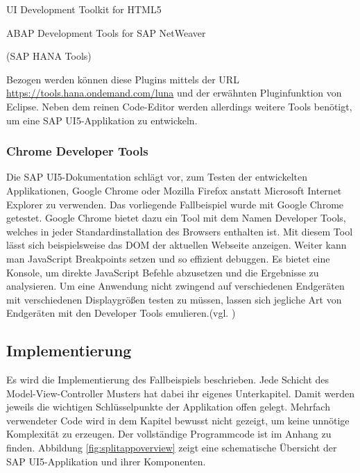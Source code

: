 \vspace{1em}
\begin{compactitem}
  \item UI Development Toolkit for HTML5
  \item ABAP Development Tools for SAP NetWeaver
  \item (SAP HANA Tools)
\end{compactitem}
\vspace{1em}

Bezogen werden können diese Plugins mittels der URL \url{https://tools.hana.ondemand.com/luna} und der erwähnten Pluginfunktion von Eclipse. Neben dem reinen Code-Editor werden allerdings weitere Tools benötigt, um eine SAP UI5-Applikation zu entwickeln.

\subsubsection{Chrome Developer Tools}
Die SAP UI5-Dokumentation schlägt vor, zum Testen der entwickelten Applikationen, Google Chrome oder Mozilla Firefox anstatt Microsoft Internet Explorer zu verwenden. Das vorliegende Fallbeispiel wurde mit Google Chrome getestet. Google Chrome bietet dazu ein Tool mit dem Namen Developer Tools, welches in jeder Standardinstallation des Browsers enthalten ist. Mit diesem Tool lässt sich beispielsweise das DOM der aktuellen Webseite anzeigen. Weiter kann man JavaScript Breakpoints setzen und so effizient debuggen. Es bietet eine Konsole, um direkte JavaScript Befehle abzusetzen und die Ergebnisse zu analysieren. Um eine Anwendung nicht zwingend auf verschiedenen Endgeräten mit verschiedenen Displaygrößen testen zu müssen, lassen sich jegliche Art von Endgeräten mit den Developer Tools emulieren.(vgl. \cite{DevTools})



\subsection{Implementierung}
Es wird die Implementierung des Fallbeispiels beschrieben. Jede Schicht des Model-View-Controller Musters hat dabei ihr eigenes Unterkapitel. Damit werden jeweils die wichtigen Schlüsselpunkte der Applikation offen gelegt. Mehrfach verwendeter Code wird in dem Kapitel bewusst nicht gezeigt, um keine unnötige Komplexität zu erzeugen. Der vollständige Programmcode ist im Anhang zu finden. Abbildung \ref{fig:splitappoverview} zeigt eine schematische Übersicht der SAP UI5-Applikation und ihrer Komponenten.

